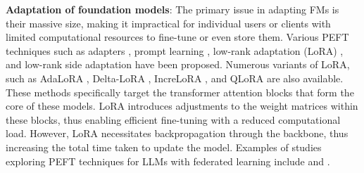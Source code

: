 \noindent\textbf{Adaptation of foundation models}: 
The primary issue in adapting FMs is their massive size, making it impractical for individual users or clients with limited computational resources to fine-tune or even store them. Various PEFT techniques such as adapters \cite{houlsby2019parameter, lin2020exploring}, prompt learning \cite{li2021prefix}, low-rank adaptation (LoRA) \cite{hu2021lora}, and low-rank side adaptation \cite{mercea2024time} have been proposed. Numerous variants of LoRA, such as AdaLoRA \cite{zhang2023adaptive}, Delta-LoRA \cite{zi2023delta}, IncreLoRA \cite{zhang2023increlora}, and QLoRA \cite{dettmers2023qlora} are also available. These methods specifically target the transformer attention blocks that form the core of these models. LoRA \cite{hu2021lora} introduces adjustments to the weight matrices within these blocks, thus enabling efficient fine-tuning with a reduced computational load. However, 
LoRA necessitates backpropagation through the backbone, thus increasing the total time taken to update the model. Examples of studies exploring PEFT techniques for LLMs with federated learning include \cite{zhang2023fedpetuning} and \cite{zhang2023towards}. 


